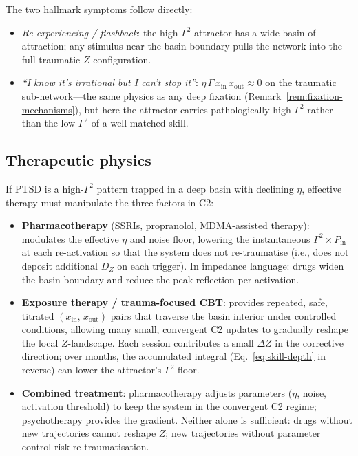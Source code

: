 \documentclass[aps,pre,twocolumn,superscriptaddress,floatfix]{revtex4-2}
\begin{document}
\noindent
The two hallmark symptoms follow directly:
\begin{itemize}
  \item \emph{Re-experiencing / flashback}:
    the high-$\Gamma^2$ attractor has a wide basin of
    attraction; any stimulus near the basin boundary
    pulls the network into the full traumatic
    $Z$-configuration.
  \item \emph{``I know it's irrational but I can't stop it''}:
    $\eta\,\Gamma\,x_{\text{in}}\,x_{\text{out}} \approx 0$
    on the traumatic sub-network---the same physics as
    any deep fixation
    (Remark~\ref{rem:fixation-mechanisms}), but here
    the attractor carries pathologically high $\Gamma^2$
    rather than the low $\Gamma^2$ of a well-matched skill.
\end{itemize}

\subsection{Therapeutic physics}
\label{sec:ptsd-therapy}

If PTSD is a high-$\Gamma^2$ pattern trapped in a deep
basin with declining $\eta$, effective therapy must
manipulate the three factors in C2:

\begin{itemize}
  \item \textbf{Pharmacotherapy} (SSRIs, propranolol,
    MDMA-assisted therapy):
    modulates the effective $\eta$ and noise floor,
    lowering the instantaneous $\Gamma^2 \times P_{\text{in}}$
    at each re-activation so that the system does not
    re-traumatise (i.e., does not deposit additional
    $D_Z$ on each trigger).
    In impedance language: drugs widen the basin boundary
    and reduce the peak reflection per activation.
  \item \textbf{Exposure therapy / trauma-focused CBT}:
    provides repeated, safe, titrated
    $(x_{\text{in}},\,x_{\text{out}})$ pairs that traverse
    the basin interior under controlled conditions,
    allowing many small, convergent C2 updates to
    gradually reshape the local $Z$-landscape.
    Each session contributes a small $\Delta Z$ in the
    corrective direction; over months, the accumulated
    integral (Eq.~\ref{eq:skill-depth} in reverse)
    can lower the attractor's $\Gamma^2$ floor.
  \item \textbf{Combined treatment}:
    pharmacotherapy adjusts parameters ($\eta$, noise,
    activation threshold) to keep the system in
    the convergent C2 regime;
    psychotherapy provides the gradient.
    Neither alone is sufficient: drugs without new
    trajectories cannot reshape $Z$; new trajectories
    without parameter control risk re-traumatisation.
\end{itemize}
\end{document}
